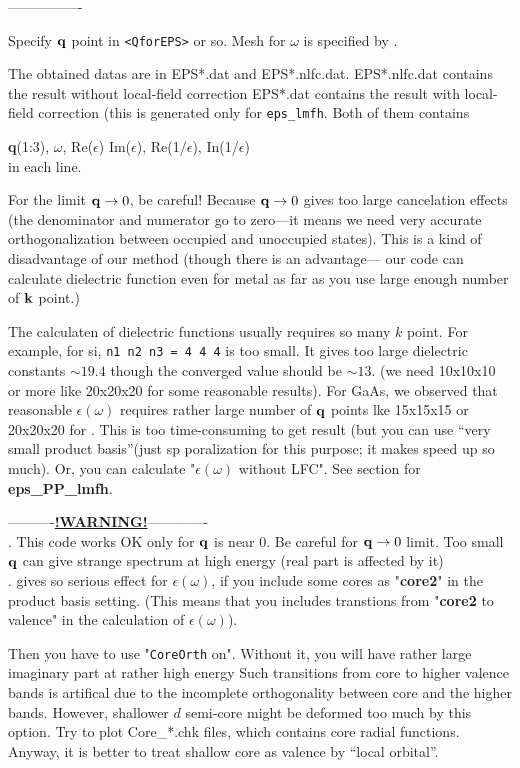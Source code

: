 \documentclass[a4paper,10pt,epsf,fleqn]{article}
\newcommand{\keyw}[1]{\fbox{\tt #1}}
\newcommand{\exe}[1]{{\bf #1}}
\newcommand{\io}[1]{{\sf  #1}}
\newcommand{\raw}[1]{{\tt #1}}
\begin{document}
{{{----------------

Specify ${\bf q}$ point in \verb#<QforEPS># or so.
Mesh for $\omega$ is specified by \keyw{dw, omg\_c}.

The obtained datas are in {\sf EPS*.dat} and {\sf EPS*.nlfc.dat}.
{\sf EPS*.nlfc.dat} contains the result without local-field correction
{\sf EPS*.dat} contains the result with local-field correction
(this is generated only for \verb#eps_lmfh#. Both of them contains

{\bf q}(1:3), $\omega$, Re($\epsilon$) Im($\epsilon$), Re(1/$\epsilon$), In(1/$\epsilon$)\\
in each line.

For the limit ${\bf q} \to 0$, be careful!
Because ${\bf q} \to 0$ gives too large cancelation effects
(the denominator and numerator go to zero---it means we need very accurate
orthogonalization between occupied and unoccupied states).
This is a kind of disadvantage of our method (though there is an advantage---
our code can calculate dielectric function even for metal 
as far as you use large enough number of ${\bf k}$ point.)

The calculaten of dielectric functions usually requires so many $k$ point. 
For example, for si,  \verb#n1 n2 n3 = 4 4 4# is too small. 
It gives too large dielectric constants $\sim19.4$ though
the converged value should be $\sim13$. (we need 10x10x10 or more like 20x20x20
for some reasonable results).
For GaAs, we observed that reasonable $\epsilon(\omega)$ requires
rather large number of ${\bf q}$ points lke 15x15x15 or 20x20x20
for \keyw{n1n2n3}. This is too time-consuming to get result
(but you can use ``very small product basis''(just sp poralization for this purpose;
it makes speed up so much). Or, you can calculate "$\epsilon(\omega)$ without LFC". 
See section for \exe{eps\_PP\_lmfh}.

----------\underline{\bf !WARNING!}-------------\\
. This code works OK only for ${\bf q}$ is near 0.
Be careful for ${\bf q} \to 0$ limit. Too small ${\bf q}$ can give strange
spectrum at high energy (real part is affected by it)\\

. \keyw{CoreOrth} gives so serious effect for 
$\epsilon(\omega)$, if you include some cores as "{\bf core2}"
in the product basis setting.
(This means that you includes transtions from "{\bf core2} to
valence" in the calculation of $\epsilon(\omega)$).

Then you have to use "\raw{CoreOrth} on". Without it,
you will have rather large imaginary part at rather high energy
Such transitions from core to higher valence bands
is artifical due to the incomplete orthogonality
between core and the higher bands.
However, shallower $d$ semi-core might be deformed too much
by this option. Try to plot \io{Core\_*.chk} files, 
which contains core radial functions. 
Anyway, it is better to treat shallow core as valence by ``local orbital''.


}}}
\end{document}
